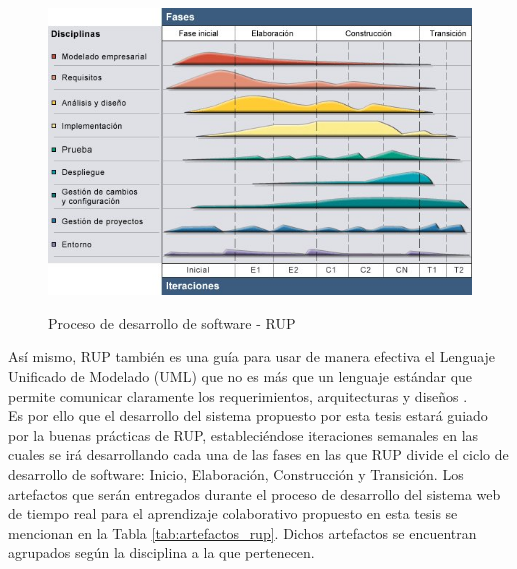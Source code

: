 \begin{figure}[!h]
  \centering
  \includegraphics[scale=0.7]{figuras/rup.jpg}\\
  \caption[RUP]{Proceso de desarrollo de software - RUP \protect\cite{rup_small}}\label{fig:rup}
\end{figure}

Así mismo, RUP también es una guía para usar de manera efectiva el Lenguaje Unificado de Modelado (UML) que no es más que un lenguaje estándar que permite comunicar claramente los requerimientos, arquitecturas y diseños \cite{rup_ibm_2014}.\\

Es por ello que el desarrollo del sistema propuesto por esta tesis estará guiado por la buenas prácticas de RUP, estableciéndose iteraciones semanales en las cuales se irá desarrollando cada una de las fases en las que RUP divide el ciclo de desarrollo de software: Inicio, Elaboración, Construcción y Transición. Los artefactos que serán entregados durante el proceso de desarrollo del sistema web de tiempo real para el aprendizaje colaborativo propuesto en esta tesis se mencionan en la Tabla \ref{tab:artefactos_rup}. Dichos artefactos se encuentran agrupados según la disciplina a la que pertenecen.

